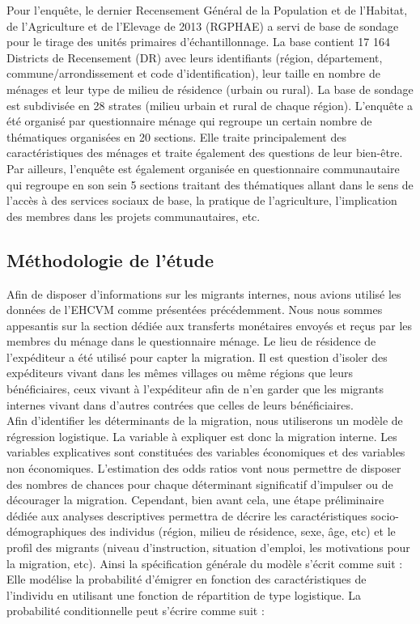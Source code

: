 \documentclass[a4paper,12pt]{article}
\begin{document}
Pour l’enquête, le dernier Recensement Général de la Population et de l’Habitat, de l’Agriculture et de l’Elevage de 2013 (RGPHAE) a servi de base de sondage pour le tirage des unités primaires d’échantillonnage. La base contient 17 164 Districts de Recensement (DR) avec leurs identifiants (région, département, commune/arrondissement et code d’identification), leur taille en nombre de ménages et leur type de milieu de résidence (urbain ou rural). La base de sondage est subdivisée en 28 strates (milieu urbain et rural de chaque région). L’enquête a été organisé par questionnaire ménage qui regroupe un certain nombre de thématiques organisées en 20 sections. Elle traite principalement des caractéristiques des ménages et traite également des questions de leur bien-être.
Par ailleurs, l’enquête est également organisée en questionnaire communautaire qui regroupe en son sein 5 sections traitant des thématiques allant dans le sens de l’accès à des services sociaux de base, la pratique de l’agriculture, l’implication des membres dans les projets communautaires, etc.\\

\subsection{Méthodologie de l’étude}
	
Afin de disposer d’informations sur les migrants internes, nous avions utilisé les données de l’EHCVM comme présentées précédemment. Nous nous sommes appesantis sur la section dédiée aux transferts monétaires envoyés et reçus par les membres du ménage dans le questionnaire ménage. Le lieu de résidence de l’expéditeur a été utilisé pour capter la migration. Il est question d’isoler des expéditeurs vivant dans les mêmes villages ou même régions que leurs bénéficiaires, ceux vivant à l’expéditeur afin de n’en garder que les migrants internes vivant dans d’autres contrées que celles de leurs bénéficiaires. \\


Afin d’identifier les déterminants de la migration, nous utiliserons un modèle de régression logistique. La variable à expliquer est donc la migration interne. Les variables explicatives sont constituées des variables économiques et des variables non économiques. L’estimation des odds ratios vont nous permettre de disposer des nombres de chances pour chaque déterminant significatif d’impulser ou de décourager la migration.
Cependant, bien avant cela, une étape préliminaire dédiée aux analyses descriptives permettra de décrire les caractéristiques socio-démographiques des individus (région, milieu de résidence, sexe, âge, etc) et le profil des migrants (niveau d’instruction, situation d’emploi, les motivations pour la migration, etc).
Ainsi la spécification générale du modèle s’écrit comme suit : Elle modélise la probabilité d’émigrer en fonction des caractéristiques de l’individu en utilisant une fonction de répartition de type logistique. La probabilité conditionnelle peut s'écrire comme suit :
\end{document}

